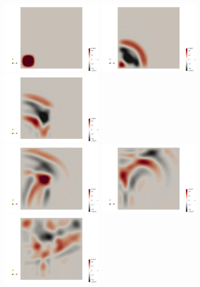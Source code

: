 \begin{center}
\includegraphics[width=5cm]{python_codes/fieldstone_165/results3/uu0000.png}
\includegraphics[width=5cm]{python_codes/fieldstone_165/results3/uu0025.png}
\includegraphics[width=5cm]{python_codes/fieldstone_165/results3/uu0050.png}\\
\includegraphics[width=5cm]{python_codes/fieldstone_165/results3/uu0075.png}
\includegraphics[width=5cm]{python_codes/fieldstone_165/results3/uu0100.png}
\includegraphics[width=5cm]{python_codes/fieldstone_165/results3/uu0150.png}
\end{center}

